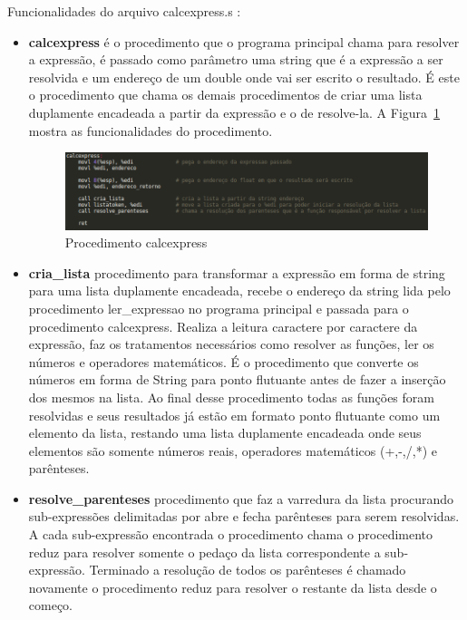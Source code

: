 \documentclass[12pt]{article}
\begin{document}
Funcionalidades do arquivo calcexpress.s :

\begin{itemize}

\item \textbf{calcexpress} é o procedimento que o programa principal chama para resolver a expressão, é passado como parâmetro uma string que é a expressão a ser resolvida e um endereço de um double onde vai ser escrito o resultado. É este o procedimento que chama os demais procedimentos de criar uma lista duplamente encadeada a partir da expressão e o de resolve-la. A Figura~\ref{calcexpress} mostra as funcionalidades do procedimento.

\begin{figure}[H]
\centering
\includegraphics[width=\textwidth]{Imagens/calcexpress.png}
\caption{Procedimento calcexpress}
\label{calcexpress}
\end{figure}

\item \textbf{cria\_lista} procedimento para transformar a expressão em forma de string para uma lista duplamente encadeada, recebe o endereço da string lida pelo procedimento ler\_expressao no programa principal e passada para o procedimento calcexpress. Realiza a leitura caractere por caractere da expressão, faz os tratamentos necessários como resolver as funções, ler os números e operadores matemáticos. É o procedimento que converte os números em forma de String para ponto flutuante antes de fazer a inserção dos mesmos na lista. Ao final desse procedimento todas as funções foram resolvidas e seus resultados já estão em formato ponto flutuante como um elemento da lista, restando uma lista duplamente encadeada onde seus elementos são somente números reais, operadores matemáticos (+,-,/,*) e parênteses.

\item \textbf{resolve\_parenteses} procedimento que faz a varredura da lista procurando sub-expressões delimitadas por abre e fecha parênteses para serem resolvidas. A cada sub-expressão encontrada o procedimento chama o procedimento reduz para resolver somente o pedaço da lista correspondente a sub-expressão. Terminado a resolução de todos os parênteses é chamado novamente o procedimento reduz para resolver o restante da lista desde o começo.


\end{itemize}
\end{document}
